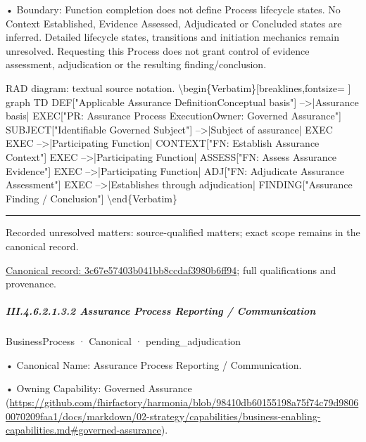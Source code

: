 •
Boundary: Function completion does not define Process lifecycle states. No Context Established, Evidence Assessed, Adjudicated or Concluded states are inferred. Detailed lifecycle states, transitions and initiation mechanics remain unresolved. Requesting this Process does not grant control of evidence assessment, adjudication or the resulting finding/conclusion.



RAD diagram: textual source notation.
\textbackslash{}begin\{Verbatim\}[breaklines,fontsize=
]
graph TD
    DEF["Applicable Assurance Definition\newline{}Conceptual basis"] -->|Assurance basis| EXEC["PR: Assurance Process Execution\newline{}Owner: Governed Assurance"]
    SUBJECT["Identifiable Governed Subject"] -->|Subject of assurance| EXEC
    EXEC -->|Participating Function| CONTEXT["FN: Establish Assurance Context"]
    EXEC -->|Participating Function| ASSESS["FN: Assess Assurance Evidence"]
    EXEC -->|Participating Function| ADJ["FN: Adjudicate Assurance Assessment"]
    EXEC -->|Establishes through adjudication| FINDING["Assurance Finding / Conclusion"]
\textbackslash{}end\{Verbatim\}



\medskip\hrule\medskip

{\small Recorded unresolved matters: source-qualified matters; exact scope remains in the canonical record.}\par
{\footnotesize \href{../../../../continuum/business/business-process/3c67e57403b041bb8ccdaf3980b6ff94.md}{Canonical record: 3c67e57403b041bb8ccdaf3980b6ff94}; full qualifications and provenance.}\par
\subparagraph*{III.4.6.2.1.3.2 Assurance Process Reporting / Communication}
\label{navigation:III.4.6.2.1.3.2}

\label{element:2fc0b626577b43feb050bcd91ac2b0a9}
{\small BusinessProcess · Canonical · pending\_adjudication}\par

•
Canonical Name: Assurance Process Reporting / Communication.



•
Owning Capability: Governed Assurance (\url{https://github.com/fhirfactory/harmonia/blob/98410db60155198a75f74c79d98060070209faa1/docs/markdown/02-strategy/capabilities/business-enabling-capabilities.md#governed-assurance}).




